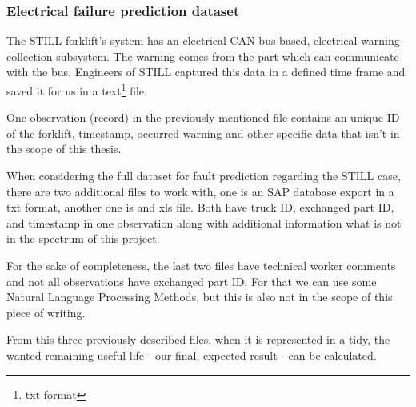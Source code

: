 			\subsubsection{Electrical failure prediction dataset}
The STILL forklift's system has an electrical CAN bus-based, electrical warning-collection subsystem. The warning comes from the part which can communicate with the bus. Engineers of STILL captured this data in a defined time frame and saved it for us in a text\footnote{txt format} file. 

One observation (record) in the previously mentioned file contains an unique ID of the forklift, timestamp, occurred warning and other specific data that isn't in the scope of this thesis.

When considering the full dataset for fault prediction regarding the STILL case, there are two additional files to work with, one is an SAP database export in a txt format, another one is and xls file. Both have truck ID, exchanged part ID, and timestamp in one observation along with additional information what is not in the spectrum of this project.

For the sake of completeness, the last two files have technical worker comments and not all observations have exchanged part ID. For that we can use some Natural Language Processing Methods, but this is also not in the scope of this piece of writing.

From this three previously described files, when it is represented in a tidy, the wanted remaining useful life  - our final, expected result - can be calculated.

